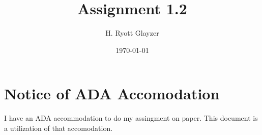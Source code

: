 \documentclass[11pt, letterpaper]{article}
\begin{document}


\title{Assignment 1.2}
\author{H. Ryott Glayzer}
\date{\today}


\maketitle


\section*{Notice of ADA Accomodation}
I have an ADA accommodation to do my assingment on paper.
This document is a utilization of that accomodation.







\end{document}

